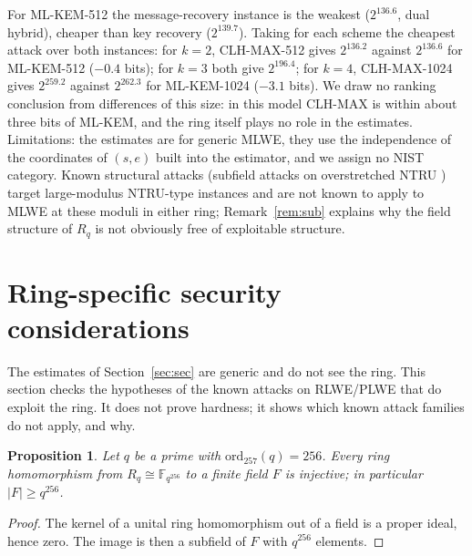 \documentclass[11pt]{article}
\newtheorem{proposition}{Proposition}
\theoremstyle{remark}
\newcommand{\F}{\mathbb{F}}
\newcommand{\Rq}{R_q}
\begin{document}
For ML-KEM-512 the message-recovery instance is the weakest ($2^{136.6}$, dual hybrid), cheaper than key recovery ($2^{139.7}$). Taking for each scheme the cheapest attack over both instances: for $k=2$, CLH-MAX-512 gives $2^{136.2}$ against $2^{136.6}$ for ML-KEM-512 ($-0.4$ bits); for $k=3$ both give $2^{196.4}$; for $k=4$, CLH-MAX-1024 gives $2^{259.2}$ against $2^{262.3}$ for ML-KEM-1024 ($-3.1$ bits). We draw no ranking conclusion from differences of this size: in this model CLH-MAX is within about three bits of ML-KEM, and the ring itself plays no role in the estimates. Limitations: the estimates are for generic MLWE, they use the independence of the coordinates of $(s,e)$ built into the estimator, and we assign no NIST category. Known structural attacks (subfield attacks on overstretched NTRU \cite{ABD16,CJL16}) target large-modulus NTRU-type instances and are not known to apply to MLWE at these moduli in either ring; Remark~\ref{rem:sub} explains why the field structure of $\Rq$ is not obviously free of exploitable structure.

\section{Ring-specific security considerations}\label{sec:ringsec}
The estimates of Section~\ref{sec:sec} are generic and do not see the ring. This section checks the hypotheses of the known attacks on RLWE/PLWE that do exploit the ring. It does not prove hardness; it shows which known attack families do not apply, and why.

\begin{proposition}\label{prop:nohom}
Let $q$ be a prime with $\mathrm{ord}_{257}(q)=256$. Every ring homomorphism from $\Rq\cong\F_{q^{256}}$ to a finite field $F$ is injective; in particular $|F|\ge q^{256}$.
\end{proposition}
\begin{proof}
The kernel of a unital ring homomorphism out of a field is a proper ideal, hence zero. The image is then a subfield of $F$ with $q^{256}$ elements.
\end{proof}
\end{document}
